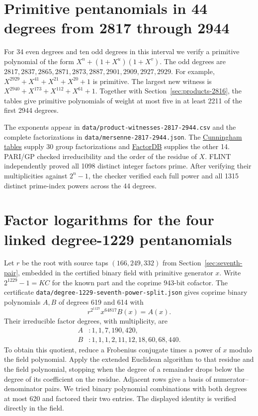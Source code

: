 \documentclass[11pt]{article}
\begin{document}
\section{Primitive pentanomials in 44 degrees from 2817 through 2944}
\label{sec:products-2944}
For 34 even degrees and ten odd degrees in this interval we verify
a primitive polynomial of the form \(X^n+(1+X^u)(1+X^v)\). The odd
degrees are \(2817,2837,2865,2871,2873,2887,2901,2909,2927,2929\).
For example, \(X^{2929}+X^{41}+X^{21}+X^{20}+1\) is primitive.
The largest new witness is \(X^{2940}+X^{173}+X^{112}+X^{61}+1\).
Together with Section~\ref{sec:products-2816}, the tables give
primitive polynomials of weight at most five in at least 2211 of the
first 2944 degrees.

The exponents appear in \nolinkurl{data/product-witnesses-2817-2944.csv}
and the complete factorizations in \nolinkurl{data/mersenne-2817-2944.json}.
The \href{https://github.com/postvakje/Reformatted-Cunningham-Project-tables/tree/dff2e282ff15399b16b4fb840a410aa2a37076b7}{Cunningham tables}
supply 30 group factorizations and
\href{https://factordb.com/index.php?query=2\%5E2929-1}{FactorDB}
supplies the other 14. PARI/GP checked irreducibility and the order of
the residue of \(X\). FLINT independently proved all 1098 distinct
integer factors prime. After verifying their multiplicities against
\(2^n-1\), the checker verified each full power and all 1315 distinct
prime-index powers across the 44 degrees.

\section{Factor logarithms for the four linked degree-1229 pentanomials}
\label{sec:seventh-split}
Let \(r\) be the root with source taps \((166,249,332)\) from
Section~\ref{sec:seventh-pair}, embedded in the certified binary
field with primitive generator \(x\). Write \(2^{1229}-1=KC\) for
the known part and the coprime 943-bit cofactor. The certificate
\nolinkurl{data/degree-1229-seventh-power-split.json} gives coprime
binary polynomials \(A,B\) of degrees 619 and 614 with
\[
                 r^{2^{1127}}x^{64817}B(x)=A(x).
\]
Their irreducible factor degrees, with multiplicity, are
\[
 \begin{aligned}
 A &: 1,1,7,190,420,\\
 B &: 1,1,1,2,11,12,18,60,68,440.
 \end{aligned}
\]
To obtain this quotient, reduce a Frobenius conjugate times a power
of \(x\) modulo the field polynomial. Apply the extended Euclidean
algorithm to that residue and the field polynomial, stopping when
the degree of a remainder drops below the degree of its coefficient
on the residue. Adjacent rows give a basis of numerator--denominator
pairs. We tried binary polynomial combinations with both degrees at
most 620 and factored their two entries. The displayed identity is
verified directly in the field.
\end{document}
